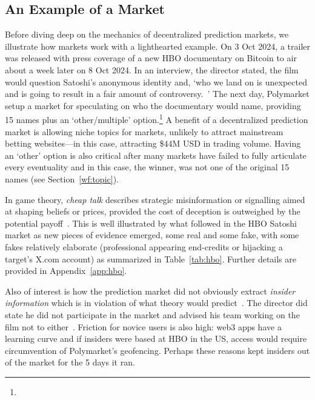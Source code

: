 \subsection{An Example of a Market}
\label{sec:hbo}

Before diving deep on the mechanics of decentralized prediction markets, we illustrate how markets work with a lighthearted example. On 3 Oct 2024, a trailer was released with press coverage of a new HBO documentary on Bitcoin to air about a week later on 8 Oct 2024. In an interview, the director stated, the film would question Satoshi's anonymous identity and, `who we land on is unexpected and is going to result in a fair amount of controversy.~\cite{Bec24}' The next day, Polymarket setup a market for speculating on who the documentary would name, providing 15 names plus an `other/multiple' option.\footnote{} A benefit of a decentralized prediction market is allowing niche topics for markets, unlikely to attract mainstream betting websites---in this case, attracting \$44M USD in trading volume. Having an `other' option is also critical after many markets have failed to fully articulate every eventuality and in this case, the winner, was not one of the original 15 names (see Section~\ref{wf:topic}).

In game theory, \textit{cheap talk} describes strategic misinformation or signalling aimed at shaping beliefs or prices, provided the cost of deception is outweighed by the potential payoff~\cite{CrSo82}. This is well illustrated by what followed in the HBO Satoshi market as new pieces of evidence emerged, some real and some fake, with some fakes relatively elaborate (professional appearing end-credits or hijacking a target's X.com account) as summarized in Table~\ref{tab:hbo}. Further details are provided in Appendix~\ref{app:hbo}.

Also of interest is how the prediction market did not obviously extract \textit{insider information} which is in violation of what theory would predict~\cite{Han07}. The director did state he did not participate in the market and advised his team working on the film not to either~\cite{Beg24}. Friction for novice users is also high: web3 apps have a learning curve and if insiders were based at HBO in the US, access would require circumvention of Polymarket's geofencing. Perhaps these reasons kept insiders out of the market for the 5 days it ran.


